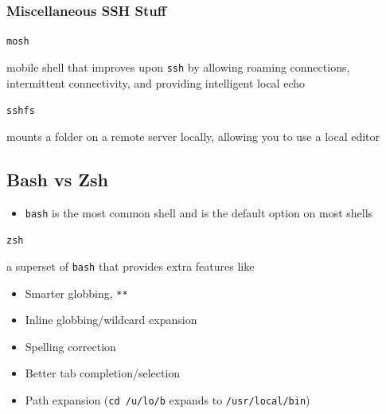 \documentclass[letterpaper,12pt]{article}
\newcommand*{\lstitem}[1]{
  \setbox0\hbox{\lstinline{#1}}
  \item[\usebox0]
}
\begin{document}
\subsubsection{Miscellaneous SSH Stuff}

\begin{description}
  \lstitem{mosh} mobile shell that improves upon \lstinline{ssh} by allowing roaming connections, intermittent connectivity, and providing intelligent local echo
  \lstitem{sshfs} mounts a folder on a remote server locally, allowing you to use a local editor
\end{description}

\subsection{Bash vs Zsh}
\begin{itemize}
  \item \lstinline{bash} is the most common shell and is the default option on most shells
\end{itemize}

\begin{description}
  \lstitem{zsh} a superset of \lstinline{bash} that provides extra features like
\end{description}

\begin{itemize}
  \item Smarter globbing, \lstinline{**}
  \item Inline globbing/wildcard expansion
  \item Spelling correction
  \item Better tab completion/selection
  \item Path expansion (\lstinline{cd /u/lo/b} expands to \lstinline{/usr/local/bin})
\end{itemize}
\end{document}
